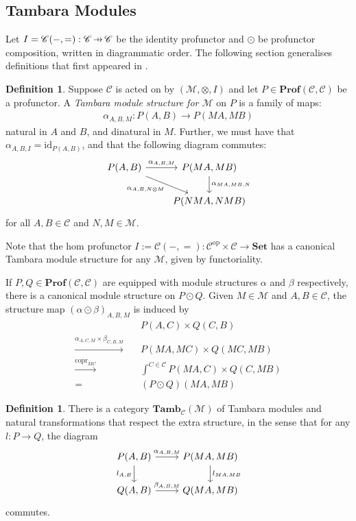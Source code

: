 \documentclass[11pt,a4paper]{article}
\theoremstyle{plain}
\theoremstyle{definition}
\newtheorem{definition}[theorem]{Definition}
\newcommand{\C}{\mathscr{C}}
\newcommand{\M}{\mathscr{M}}
\newcommand{\Set}{\mathbf{Set}}
\newcommand{\Prof}{\mathbf{Prof}}
\newcommand{\Tamb}{\mathbf{Tamb}}
\newcommand{\id}{\mathrm{id}}
\newcommand{\op}{\mathrm{op}}
\DeclareMathOperator{\copr}{copr}
\newcommand{\hto}{\ensuremath{\,\mathaccent\shortmid\rightarrow\,}}
\begin{document}
\subsection{Tambara Modules}
Let $I = \C(-,{=}) : \C \hto \C$ be the identity profunctor and $\odot$ be profunctor composition, written in diagrammatic order. The following section generalises definitions that first appeared in \cite{Doubles}.
\begin{definition}
Suppose $\C$ is acted on by $(\M, \otimes, I)$ and let $P \in \Prof(\C, \C)$ be a profunctor. A \emph{Tambara module structure for $\M$} on $P$ is a family of maps:
\begin{align*}
\alpha_{A,B,M} : P(A,B) \to P(MA, MB)
\end{align*}
natural in $A$ and $B$, and dinatural in $M$. Further, we must have that $\alpha_{A,B,I} = \id_{P(A,B)}$, and that the following diagram commutes:
\[
\begin{tikzcd}
P(A,B) \ar[r, "\alpha_{A,B,M}"] \ar[dr, "\alpha_{A, B, N \otimes M}" below left] & P(MA, MB) \ar[d, "\alpha_{MA, MB, N}" right] \\
& P(NMA, NMB)
\end{tikzcd}
\]
for all $A, B \in \C$ and $N, M \in \M$.
\end{definition}

Note that the hom profunctor $I := \C(-, =) : \C^\op \times \C \to \Set$ has a canonical Tambara module structure for any $\M$, given by functoriality.

If $P, Q \in \Prof(\C, \C)$ are equipped with module structures $\alpha$ and $\beta$ respectively, there is a canonical module structure on $P \odot Q$. Given $M \in \M$ and $A,B \in \C$, the structure map $(\alpha \odot \beta)_{A,B,M}$ is induced by
\begin{align*}
&P(A,C) \times Q(C,B)  \\
\xrightarrow{\alpha_{A,C,M} \times \beta_{C,B,M}} \quad& P(MA, MC) \times Q(MC, MB) \\
\xrightarrow{\copr_{MC}} \quad&\int^{C \in \C} P(MA, C) \times Q(C, MB) \\
= \quad&(P \odot Q)(MA, MB)
\end{align*}

\begin{definition}
There is a category $\Tamb_\C(\M)$ of Tambara modules and natural transformations that respect the extra structure, in the sense that for any $l : P \to Q$, the diagram
\[
\begin{tikzcd}
P(A,B) \ar[r, "\alpha_{A,B,M}"] \ar[d, "l_{A,B}" left] & P(MA, MB) \ar[d, "l_{MA, MB}" right] \\
Q(A,B) \ar[r, "\beta_{A,B,M}"] & Q(MA, MB)
\end{tikzcd}
\]
commutes.
\end{definition}
\end{document}

